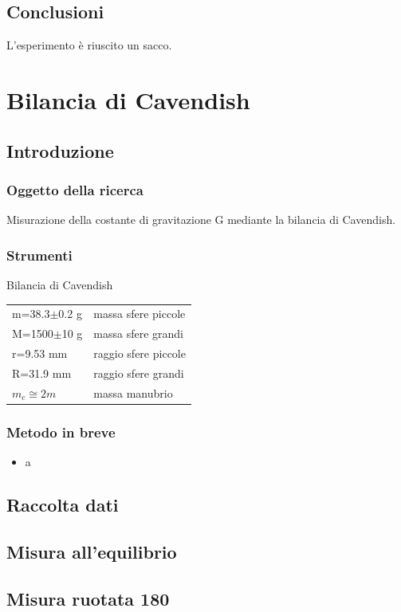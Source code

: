 \documentclass[a4paper,10pt]{report}
\begin{document}
\section{Conclusioni}
L'esperimento è riuscito un sacco.


\chapter{Bilancia di Cavendish}
\section{Introduzione}
\subsection{Oggetto della ricerca}
Misurazione della costante di gravitazione G mediante la bilancia di Cavendish.
\subsection{Strumenti}
Bilancia di Cavendish\\

\begin{tabular}{ll}
m=38.3$\pm$0.2 g & massa sfere piccole\\
M=1500$\pm$10 g	 & massa sfere grandi\\
r=9.53 mm & raggio sfere piccole\\
R=31.9 mm	 & raggio sfere grandi\\
$m_c\cong 2m$ & massa manubrio\\
\end{tabular}

\subsection{Metodo in breve}
\begin{itemize}
\item a
\end{itemize}
\section{Raccolta dati}
\section{Misura all'equilibrio}
\section{Misura ruotata 180}
\end{document}
